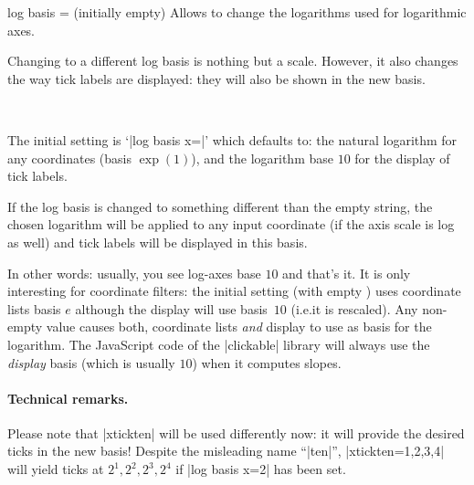 \begin{pgfplotsxykey}{log basis \x= (initially empty)}
    Allows to change the logarithms used for logarithmic axes.

    Changing to a different log basis is nothing but a scale. However, it also
    changes the way tick labels are displayed: they will also be shown in the
    new basis.
\begin{codeexample}[]
~
\end{codeexample}

    The initial setting is `|log basis x=|' which defaults to: the natural
    logarithm for any coordinates (basis $\exp(1)$), and the logarithm base
    $10$ for the display of tick labels.

    If the log basis is changed to something different than the empty string,
    the chosen logarithm will be applied to any input coordinate (if the axis
    scale is log as well) and tick labels will be displayed in this basis.

    In other words: usually, you see log-axes base $10$ and that's it. It is
    only interesting for coordinate filters: the initial setting (with empty
    ) uses coordinate lists basis $e$ although the display will
    use basis~$10$ (i.e.\@ it is rescaled). Any non-empty value 
    causes both, coordinate lists \emph{and} display to use  as
    basis for the logarithm. The JavaScript code of the |clickable| library
    will always use the \emph{display} basis (which is usually $10$) when it
    computes slopes.


    \paragraph{Technical remarks.}


    Please note that |xtickten| will be used differently now: it will provide
    the desired ticks in the new basis! Despite the misleading name ``|ten|'',
    |xtickten={1,2,3,4}| will yield ticks at $2^1,2^2,2^3,2^4$ if
    |log basis x=2| has been set.
\end{pgfplotsxykey}


